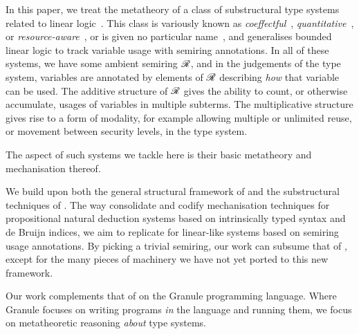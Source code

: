 
In this paper, we treat the metatheory of a class of substructural type
systems related to linear logic~\cite{girard87linear}.
This class is variously known as
\emph{coeffectful}~\cite{PetricekOM14,Granule18},
\emph{quantitative}~\cite{BrunelGMZ14,Atkey18}, or
\emph{resource-aware}~\cite{GhicaS14},
or is given no particular name~\cite{reed10distance,abadi99core},
and generalises bounded linear logic to track variable usage with semiring
annotations.
In all of these systems, we have some ambient semiring $\mathscr R$, and in the
judgements of the type system, variables are annotated by elements of $\mathscr R$
describing \emph{how} that variable can be used.
The additive structure of $\mathscr R$ gives the ability to count, or otherwise
accumulate, usages of variables in multiple subterms.
The multiplicative structure gives rise to a form of modality, for example
allowing multiple or unlimited reuse, or movement between security levels, in
the type system.

The aspect of such systems we tackle here is their basic metatheory and
mechanisation thereof.

We build upon both the general structural framework of
\citet{AACMM20} and the substructural techniques of \citet{WA20}.
The way \citeauthor{AACMM20} consolidate and codify mechanisation techniques for
propositional natural deduction systems based on intrinsically typed syntax and
de Bruijn indices, we aim to replicate for linear-like systems based on
semiring usage annotations.
By picking a trivial semiring, our work can subsume that of
\citeauthor{AACMM20}, except for the many pieces of machinery we have not yet
ported to this new framework.

Our work complements that of \citet{Granule18} on the Granule programming
language.
Where Granule focuses on writing programs \emph{in} the language and running
them, we focus on metatheoretic reasoning \emph{about} type systems.

